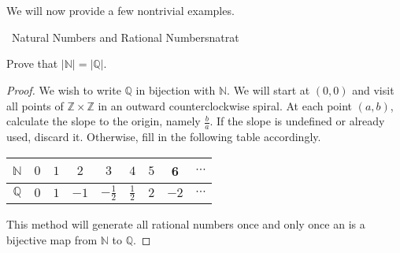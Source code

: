         \vphantom
        \\
        \\
        We will now provide a few nontrivial examples.
        \begin{example}{\Difficulty\,\Difficulty\,\,Natural Numbers and Rational Numbers}{natrat}
        
            Prove that \(|\mathbb{N}|=|\mathbb{Q}|\).
            \begin{proof}
                We wish to write \(\mathbb{Q}\) in bijection with \(\mathbb{N}\). We will start at \((0,0)\) and visit all points of \(\mathbb{Z}\times\mathbb{Z}\) in an outward counterclockwise spiral. At each point \((a,b)\), calculate the slope to the origin, namely \(\frac{b}{a}\). If the slope is undefined or already used, discard it. Otherwise, fill in the following table accordingly.
                \begin{center}
                    \begin{tabular}{ccccccccc}
                        \hline
                        \(\mathbb{N}\) & \(0\) & \(1\) & \(2\) & \(3\) & \(4\) & \(5\) & 6 & \(\cdots\) \\
                        \hline
                        \(\mathbb{Q}\) & \(0\) & \(1\) & \(-1\) & \(-\frac{1}{2}\) & \(\frac{1}{2}\) & \(2\) & \(-2\) & \(\cdots\) \\
                        \hline
                    \end{tabular}
                \end{center}
                This method will generate all rational numbers once and only once an is a bijective map from \(\mathbb{N}\) to \(\mathbb{Q}\).
            \end{proof}
        
        \end{example}
        \pagebreak
